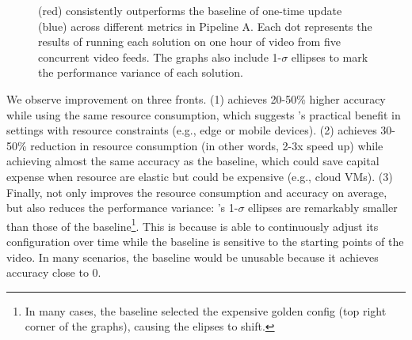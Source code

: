 \begin{figure}[t!]
{        \label{subfig:1}
    }
    \caption{\name (red) consistently outperforms the baseline of one-time update (blue) across different metrics in Pipeline A. Each dot represents the results of running each solution on one hour of video from five concurrent video feeds. The graphs also include 1-$\sigma$ ellipses to mark the performance variance of each solution.}
    \label{fig:eval:e2e}
    \vskip -8mm
\end{figure}

We observe improvement on three fronts.
(1) \name achieves 20-50\% higher accuracy while using the same resource consumption, which suggests \name's practical benefit in settings with resource constraints (e.g., edge or mobile devices).
(2) \name achieves 30-50\% reduction in resource consumption (in other words, 2-3x speed up) while achieving almost the same accuracy as the baseline, which could save capital expense when resource are elastic but could be expensive (e.g., cloud VMs).
(3) Finally, \name not only improves the resource consumption and accuracy on average, but also reduces the performance variance: \name's 1-$\sigma$ ellipses are remarkably smaller than those of the baseline\footnote{In many cases, the baseline selected the expensive golden config (top right corner of the graphs), causing the elipses to shift.}. This is because \name is able to continuously adjust its configuration over time while the baseline is sensitive to the starting points of the video. In many scenarios, the baseline would be unusable because it achieves accuracy close to 0.

